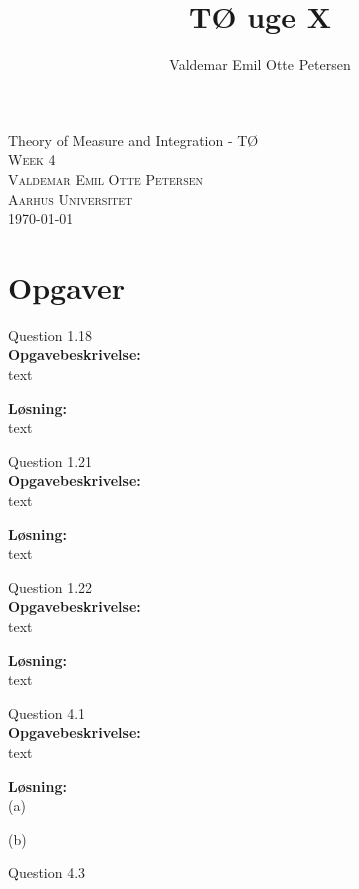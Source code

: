 \documentclass{article}
\author{Valdemar Emil Otte Petersen}
\title{TØ uge X}
\begin{document}
\begingroup

\centering 
{\LARGE Theory of Measure and Integration - TØ}\\ %
\vspace*{1\baselineskip}
\scshape
Week 4\\ 
Valdemar Emil Otte Petersen\\ %
{\small Aarhus Universitet}\\ 
{\small \today}

\endgroup

\section{Opgaver}
{\LARGE Question 1.18}\\

\textbf{Opgavebeskrivelse:}\\
text

\vspace{15px}
\textbf{Løsning:}\\
text


\vspace{35px}
{\LARGE Question 1.21}\\

\textbf{Opgavebeskrivelse:}\\
text

\vspace{15px}
\textbf{Løsning:}\\
text

\vspace{35px}
{\LARGE Question 1.22}\\

\textbf{Opgavebeskrivelse:}\\
text

\vspace{15px}
\textbf{Løsning:}\\
text

\vspace{35px}
{\LARGE Question 4.1}\\

\textbf{Opgavebeskrivelse:}\\
text

\vspace{15px}
\textbf{Løsning:}\\
(a)

(b)

\vspace{35px}
{\LARGE Question 4.3}\\
\end{document}
